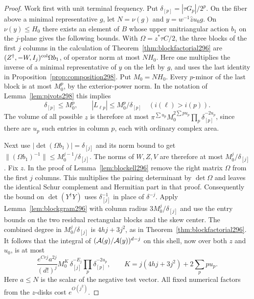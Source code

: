 \documentclass[a4paper,11pt]{article}
\theoremstyle{definition}
\theoremstyle{remark}
\numberwithin{equation}{section}
\begin{document}
\begin{proof}
Work first with unit terminal frequency. Put
\(\delta_{[p]}=|\tau G_p|/2^p\). On the fiber above a
minimal representative \(g\), let \(N=\nu(g)\) and
\(y=w^{-1}\widehat z u_0g\). On \(\nu(y)\le H_0\) there
exists an element of \(B\) whose upper unitriangular action
\(b_1\) on the \(j\)-plane gives the following bounds.
With \(\Omega=z^*\tau C/2\), the three blocks of the
first \(j\) columns in the calculation of
Theorem~\ref{thm:blockfactorial296} are
\((Z^\dagger,-W,I_j)^{\rm col}\Omega b_1\), of operator
norm at most \(NH_0\). Here one multiplies the inverse of
a minimal representative of \(y\) on the left by \(g\),
and uses the last identity in Proposition~\ref{prop:composition298}.
Put \(M_0=NH_0\). Every \(p\)-minor of the last block is
at most \(M_0^p\), by the exterior-power norm. In the
notation of Lemma~\ref{lem:pivots298} this implies
\[
 \delta_{[p]}\le M_0^p,\qquad
 |L_{\ell p}|\le M_0^p/\delta_{[p]}
                \quad (i(\ell)>i(p)).
\]
The volume of all possible \(z\) is therefore at most
\(\pi^{\sum u_p} M_0^{2\sum p u_p}
\prod_p\delta_{[p]}^{-2u_p}\), since there are \(u_p\)
such entries in column \(p\), each with ordinary complex area.

Next use \(|\det(\Omega b_1)|=\delta_{[j]}\) and its
norm bound to get
\(\|(\Omega b_1)^{-1}\|\le M_0^{j-1}/\delta_{[j]}\).
The norms of \(W,Z,V\) are therefore at most \(M_0^j/\delta_{[j]}\).
Fix \(z\). In the proof of Lemma~\ref{lem:blockell296}
remove the right matrix \(\Omega\)
from the first \(j\) columns. This
multiplies the pairing determinant by \(\det\Omega\)
and leaves the identical Schur complement and Hermitian
part in that proof. Consequently the bound on
\(\det(Y^\dagger Y)\) uses \(\delta_{[j]}^{-1}\) in
place of \(\delta^{-j}\).
Apply Lemma~\ref{lem:blockgram296} with column radius
\(3M_0^j/\delta_{[j]}\) and use the entry bounds on
the two residual rectangular blocks and the skew center.
The combined degree in \(M_0^j/\delta_{[j]}\) is
\(4hj+3j^2\), as in Theorem~\ref{thm:blockfactorial296}.
It follows that the integral of
\(({\cal A}(g)/{\cal A}(y))^{d-j}\) on this shell,
now over both \(z\) and \(u_0\), is at most
\[
 \frac{e^{Crj}a^{2j}}{(d!)^j}
 M_0^{K}\,\delta_{[j]}^{-E_j}
               \prod_p\delta_{[p]}^{-2u_p},
 \qquad K=j(4hj+3j^2)+2\sum_p p u_p.
\]
Here \(a\le N\) is the scalar of the negative test
vector. All fixed numerical factors from the \(z\)-disks
cost \(e^{O(j^2)}\).


\end{proof}
\end{document}
